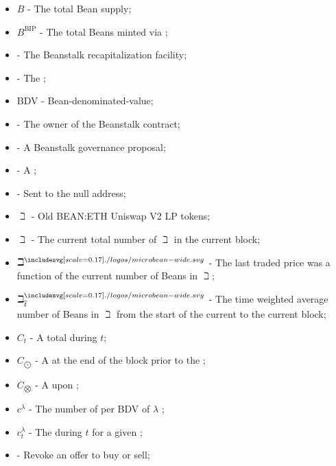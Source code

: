 \documentclass[class=article, crop=false]{standalone}
\begin{document}
\begin{itemize}[topsep=0pt, itemsep=3pt,leftmargin=16pt]
    \item[] $B$ - \hypertarget{ht16}{The total Bean supply};
    \item[] $B^{\text{BIP}}$ - \hypertarget{ht17}{The total Beans minted via };
    \item[]  - \hypertarget{ht18}{The Beanstalk recapitalization facility};
    \item[]  - \hypertarget{ht19}{The };
    \item[] BDV - \hypertarget{ht20}{Bean-denominated-value};
    \item[]  - \hypertarget{ht21}{The owner of the Beanstalk contract};
    \item[]  - \hypertarget{ht22}{A Beanstalk governance proposal};
    \item[]  - \hypertarget{ht23}{A };
    \item[]  - \hypertarget{ht24}{Sent to the null address};
    \item[] $\beth$ - \hypertarget{ht25}{Old BEAN:ETH Uniswap V2 LP tokens};
    \item[] $\beth$ - \hypertarget{ht26}{The current total number of $\beth$ in the current block};
    \item[] $\beth^{\bean}$ - \hypertarget{ht27}{The last traded price was a function of the current number of Beans in $\beth$};
    \item[] $\beth_{\overline{t}}^{\bean}$ - \hypertarget{ht28}{The time weighted average number of Beans in $\beth$ from the start of the current  to the current block};
    \item[] $C_t$ - \hypertarget{ht29}{A  total  during $t$};
    \item[] $C_{\bigodot}$ - \hypertarget{ht30}{A   at the end of the block prior to the };
    \item[] $C_{\bigotimes}$ - \hypertarget{ht31}{A   upon };
    \item[] $c^{\lambda}$ - \hypertarget{ht32}{The number of  per BDV of $\lambda$ };
    \item[] $c_{t}^{\lambda}$ - \hypertarget{ht33}{The  during $t$ for a given };
    \item[]  - \hypertarget{ht34}{Revoke an offer to buy or sell};

\end{itemize}
\end{document}
